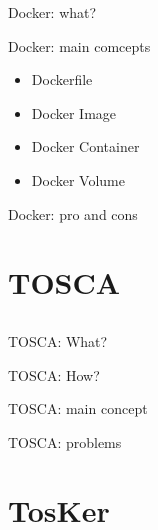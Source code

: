 \documentclass{beamer}
\begin{document}
\begin{frame}{Docker: what?}

\end{frame}

  \begin{frame}{Docker: main comcepts}
	\begin{itemize}
		\item Dockerfile
		\item Docker Image
		\item Docker Container
		\item Docker Volume
	\end{itemize}

  \end{frame}

  \begin{frame}{Docker: pro and cons}

  \end{frame}

\section{TOSCA}\subsection*{}

  \begin{frame}{TOSCA: What?}

  \end{frame}

  \begin{frame}{TOSCA: How?}

  \end{frame}

  \begin{frame}{TOSCA: main concept}

  \end{frame}

  \begin{frame}{TOSCA: problems}

  \end{frame}

\section{TosKer}\subsection*{}
\end{document}
